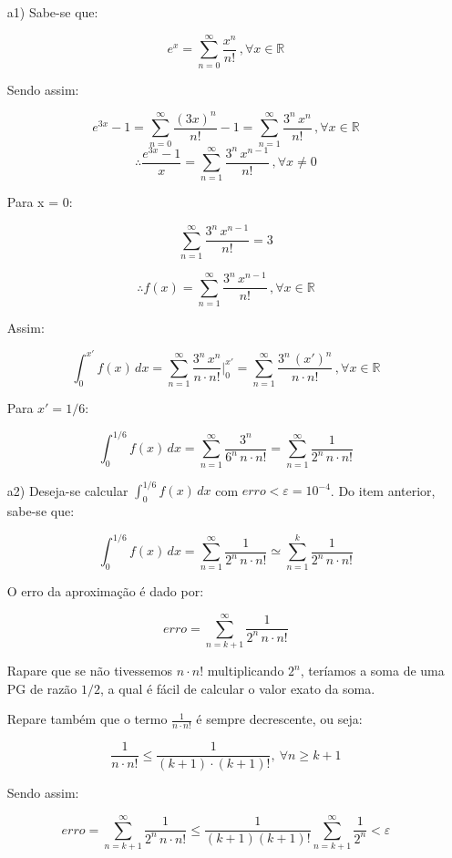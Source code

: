 \documentclass[12pt,a4paper]{article}
\begin{document}
\begin{itemize}
\item[a1)] Sabe-se que:

$$ e^x  = \sum_{n=0}^\infty \frac{x^n}{n!} \, , \forall x \in \mathbb{R}$$

Sendo assim:

$$ e^{3x} - 1 = \sum_{n=0}^\infty \frac{(3x)^n}{n!} - 1 =  \sum_{n=1}^\infty \frac{3^n \, x^n}{n!} \, , \forall x \in \mathbb{R} $$
$$ \therefore \frac{e^{3x} - 1}{x} = \sum_{n=1}^\infty \frac{3^n \, x^{n-1}}{n!} \, , \forall x \neq 0 $$

Para x = 0:

$$ \sum_{n=1}^\infty \frac{3^n \, x^{n-1}}{n!} = 3 $$

$$ \therefore f(x) = \sum_{n=1}^\infty \frac{3^n \, x^{n-1}}{n!} \, , \forall x \in \mathbb{R} $$

Assim:

$$ \int_{0}^{x'} f(x) \, dx = \sum_{n=1}^\infty \frac{3^n \, x^{n}}{n \cdot n!} \Big|_{0}^{x'} = \sum_{n=1}^\infty \frac{3^n \, (x')^{n}}{n \cdot n!} \, , \forall x \in \mathbb{R} $$

Para $ x' = 1/6$:

$$ \int_{0}^{1/6} f(x) \, dx =  \sum_{n=1}^\infty \frac{3^n}{ 6^n \, n \cdot n!} = \sum_{n=1}^\infty \frac{1}{ 2^n \, n \cdot n!} $$

\item[a2)] Deseja-se calcular $ \displaystyle\int_{0}^{1/6} f(x) \, dx$ com $erro < \varepsilon = 10^{-4}$. Do item anterior, sabe-se que:

$$ \int_{0}^{1/6} f(x) \, dx = \sum_{n=1}^\infty \frac{1}{ 2^n \, n \cdot n!} \simeq \sum_{n=1}^k \frac{1}{ 2^n \, n \cdot n!}  $$

O erro da aproximação é dado por:

$$ erro = \sum_{n=k+1}^\infty \frac{1}{ 2^n \, n \cdot n!} $$

Rapare que se não tivessemos $ n \cdot n!$ multiplicando $2^n$, teríamos a soma de uma PG de razão $1/2$, a qual é fácil de calcular o valor exato da soma.

Repare também que o termo $ \frac{1}{n \cdot n!} $ é sempre decrescente, ou seja:

$$ \frac{1}{n \cdot n!} \leq \frac{1}{ (k+1) \cdot (k+1)!} ,\ \forall n \geq k+1 $$

Sendo assim:

$$ erro = \sum_{n=k+1}^\infty \frac{1}{ 2^n \, n \cdot n!} \leq \frac{1}{(k+1)(k+1)!} \sum_{n=k+1}^\infty \frac{1}{ 2^n} < \varepsilon $$


\end{itemize}
\end{document}
